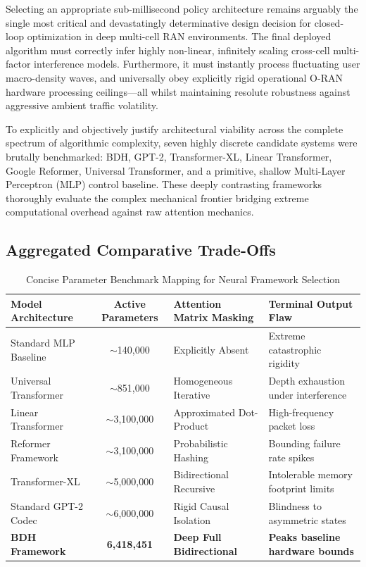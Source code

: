 \documentclass[12pt,a4paper]{article}
\begin{document}
Selecting an appropriate sub-millisecond policy architecture remains arguably the single most critical and devastatingly determinative design decision for closed-loop optimization in deep multi-cell RAN environments. The final deployed algorithm must correctly infer highly non-linear, infinitely scaling cross-cell multi-factor interference models. Furthermore, it must instantly process fluctuating user macro-density waves, and universally obey explicitly rigid operational O-RAN hardware processing ceilings—all whilst maintaining resolute robustness against aggressive ambient traffic volatility.

To explicitly and objectively justify architectural viability across the complete spectrum of algorithmic complexity, seven highly discrete candidate systems were brutally benchmarked: BDH, GPT-2, Transformer-XL, Linear Transformer, Google Reformer, Universal Transformer, and a primitive, shallow Multi-Layer Perceptron (MLP) control baseline. These deeply contrasting frameworks thoroughly evaluate the complex mechanical frontier bridging extreme computational overhead against raw attention mechanics.

\subsection{Aggregated Comparative Trade-Offs}

\begin{table}[H]
\centering
\caption{Concise Parameter Benchmark Mapping for Neural Framework Selection}
\begin{tabular}{@{}l c p{3.5cm} p{4cm}@{}}
\toprule
Model Architecture & Active Parameters & Attention Matrix Masking & Terminal Output Flaw \\ 
\midrule
Standard MLP Baseline & $\sim$140,000 & Explicitly Absent & Extreme catastrophic rigidity \\
Universal Transformer & $\sim$851,000 & Homogeneous Iterative & Depth exhaustion under interference \\
Linear Transformer & $\sim$3,100,000 & Approximated Dot-Product & High-frequency packet loss \\
Reformer Framework & $\sim$3,100,000 & Probabilistic Hashing & Bounding failure rate spikes \\
Transformer-XL & $\sim$5,000,000 & Bidirectional Recursive & Intolerable memory footprint limits \\
Standard GPT-2 Codec & $\sim$6,000,000 & Rigid Causal Isolation & Blindness to asymmetric states \\
\textbf{BDH Framework} & \textbf{6,418,451} & \textbf{Deep Full Bidirectional} & \textbf{Peaks baseline hardware bounds} \\
\bottomrule
\end{tabular}
\end{table}
\end{document}
